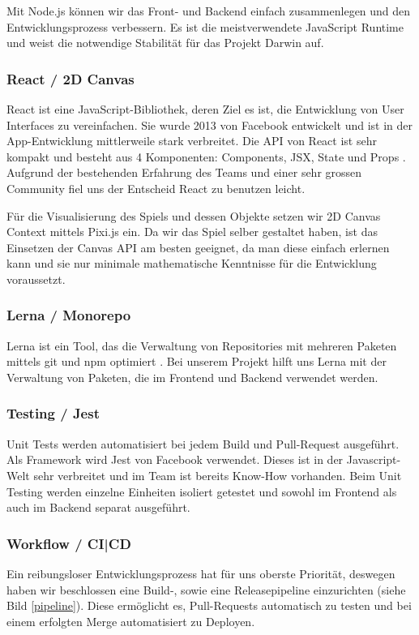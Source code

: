 \documentclass[11pt,a4paper,titlepage]{article}
\begin{document}
Mit Node.js können wir das Front- und Backend einfach zusammenlegen und den Entwicklungsprozess verbessern. Es ist die meistverwendete JavaScript Runtime \cite{node.js} und weist die notwendige Stabilität für das Projekt Darwin auf.

\subsubsection{React / 2D Canvas}
React ist eine JavaScript-Bibliothek, deren Ziel es ist, die Entwicklung von User Interfaces zu vereinfachen. Sie wurde 2013 von Facebook entwickelt und ist in der App-Entwicklung mittlerweile stark verbreitet.
Die API von React ist sehr kompakt und besteht aus 4 Komponenten: Components, JSX, State und Props \cite{react-handbook}.
Aufgrund der bestehenden Erfahrung des Teams und einer sehr grossen Community fiel uns der Entscheid React zu benutzen leicht.

Für die Visualisierung des Spiels und dessen Objekte setzen wir 2D Canvas Context mittels Pixi.js ein. Da wir das Spiel selber gestaltet haben, ist das Einsetzen der Canvas API am besten geeignet, da man diese einfach erlernen kann und sie nur minimale mathematische Kenntnisse für die Entwicklung voraussetzt.

\subsubsection{Lerna / Monorepo}
Lerna ist ein Tool, das die Verwaltung von Repositories mit mehreren Paketen mittels git und npm optimiert \cite{lerna}. Bei unserem Projekt hilft uns Lerna mit der Verwaltung von Paketen, die im Frontend und Backend verwendet werden.

\subsubsection{Testing / Jest}
Unit Tests werden automatisiert bei jedem Build und Pull-Request ausgeführt.
Als Framework wird Jest von Facebook verwendet. Dieses ist in der Javascript-Welt sehr verbreitet und im Team ist bereits Know-How vorhanden.
Beim Unit Testing werden einzelne Einheiten isoliert getestet und sowohl im Frontend als auch im Backend separat ausgeführt.

\subsubsection{Workflow / CI|CD}
Ein reibungsloser Entwicklungsprozess hat für uns oberste Priorität, deswegen haben wir beschlossen eine Build-, sowie eine Releasepipeline einzurichten (siehe Bild \ref{pipeline}). Diese ermöglicht es, Pull-Requests automatisch zu testen und bei einem erfolgten Merge automatisiert zu Deployen.
\end{document}
